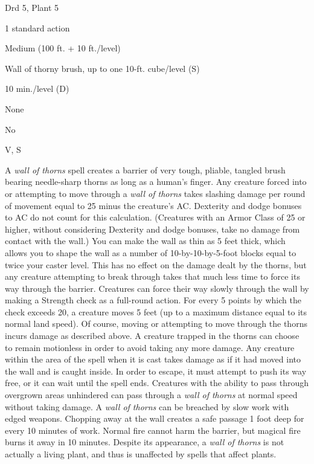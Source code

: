 
\begin{description*}
\item[Level:] Drd 5, Plant 5
\item[Casting Time:] 1 standard action
\item[Range:] Medium (100 ft. + 10 ft./level)
\item[Effect:] Wall of thorny brush, up to one 10-ft. cube/level (S)
\item[Duration:] 10 min./level (D)
\item[Saving Throw:] None
\item[Spell Resistance:] No
\item[Components:] V, S
\end{description*}

A \textit{wall of thorns} spell creates a barrier of very tough, pliable, tangled
brush bearing needle-sharp thorns as long as a human's finger. Any creature forced
into or attempting to move through a \textit{wall of thorns} takes slashing damage
per round of movement equal to 25 minus the creature's AC. Dexterity and dodge
bonuses to AC do not count for this calculation. (Creatures with an Armor Class
of 25 or higher, without considering Dexterity and dodge bonuses, take no damage
from contact with the wall.)
You can make the wall as thin as 5 feet thick, which allows you to shape the wall
as a number of 10-by-10-by-5-foot blocks equal to twice your caster level. This
has no effect on the damage dealt by the thorns, but any creature attempting to
break through takes that much less time to force its way through the barrier.
Creatures can force their way slowly through the wall by making a Strength check
as a full-round action. For every 5 points by which the check exceeds 20, a creature
moves 5 feet (up to a maximum distance equal to its normal land speed). Of course,
moving or attempting to move through the thorns incurs damage as described above.
A creature trapped in the thorns can choose to remain motionless in order to avoid
taking any more damage.
Any creature within the area of the spell when it is cast takes damage as if it
had moved into the wall and is caught inside. In order to escape, it must attempt
to push its way free, or it can wait until the spell ends. Creatures with the ability
to pass through overgrown areas unhindered can pass through a \textit{wall of thorns
}at normal speed without taking damage.
A \textit{wall of thorns} can be breached by slow work with edged weapons. Chopping
away at the wall creates a safe passage 1 foot deep for every 10 minutes of work.
Normal fire cannot harm the barrier, but magical fire burns it away in 10 minutes.
Despite its appearance, a \textit{wall of thorns} is not actually a living plant,
and thus is unaffected by spells that affect plants.